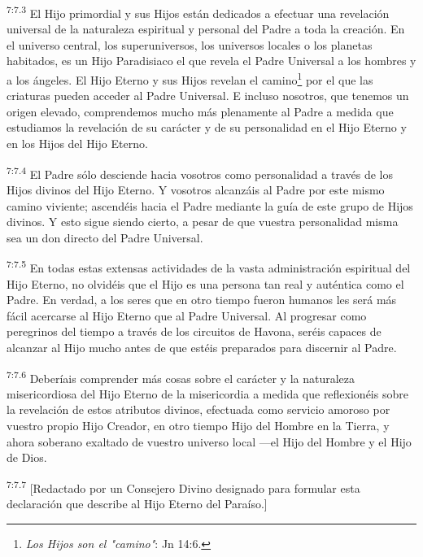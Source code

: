 \par
\textsuperscript{7:7.3} El Hijo primordial y sus Hijos están dedicados a efectuar una revelación universal de la naturaleza espiritual y personal del Padre a toda la creación. En el universo central, los superuniversos, los universos locales o los planetas habitados, es un Hijo Paradisiaco el que revela el Padre Universal a los hombres y a los ángeles. El Hijo Eterno y sus Hijos revelan el camino\footnote{\textit{Los Hijos son el "camino"}: Jn 14:6.} por el que las criaturas pueden acceder al Padre Universal. E incluso nosotros, que tenemos un origen elevado, comprendemos mucho más plenamente al Padre a medida que estudiamos la revelación de su carácter y de su personalidad en el Hijo Eterno y en los Hijos del Hijo Eterno.

\par
\textsuperscript{7:7.4} El Padre sólo desciende hacia vosotros como personalidad a través de los Hijos divinos del Hijo Eterno. Y vosotros alcanzáis al Padre por este mismo camino viviente; ascendéis hacia el Padre mediante la guía de este grupo de Hijos divinos. Y esto sigue siendo cierto, a pesar de que vuestra personalidad misma sea un don directo del Padre Universal.

\par
\textsuperscript{7:7.5} En todas estas extensas actividades de la vasta administración espiritual del Hijo Eterno, no olvidéis que el Hijo es una persona tan real y auténtica como el Padre. En verdad, a los seres que en otro tiempo fueron humanos les será más fácil acercarse al Hijo Eterno que al Padre Universal. Al progresar como peregrinos del tiempo a través de los circuitos de Havona, seréis capaces de alcanzar al Hijo mucho antes de que estéis preparados para discernir al Padre.

\par
\textsuperscript{7:7.6} Deberíais comprender más cosas sobre el carácter y la naturaleza misericordiosa del Hijo Eterno de la misericordia a medida que reflexionéis sobre la revelación de estos atributos divinos, efectuada como servicio amoroso por vuestro propio Hijo Creador, en otro tiempo Hijo del Hombre en la Tierra, y ahora soberano exaltado de vuestro universo local ---el Hijo del Hombre y el Hijo de Dios.

\par
\textsuperscript{7:7.7} [Redactado por un Consejero Divino designado para formular esta declaración que describe al Hijo Eterno del Paraíso.]